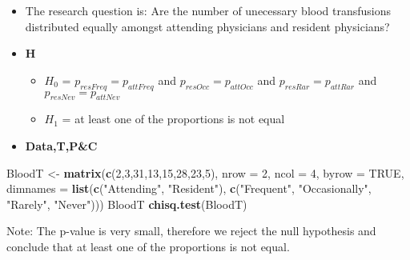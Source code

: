\documentclass[]{article}
\newenvironment{Shaded}{\begin{snugshade}}{\end{snugshade}}
\newcommand{\DataTypeTok}[1]{\textcolor[rgb]{0.13,0.29,0.53}{#1}}
\newcommand{\DecValTok}[1]{\textcolor[rgb]{0.00,0.00,0.81}{#1}}
\newcommand{\KeywordTok}[1]{\textcolor[rgb]{0.13,0.29,0.53}{\textbf{#1}}}
\newcommand{\NormalTok}[1]{#1}
\newcommand{\OtherTok}[1]{\textcolor[rgb]{0.56,0.35,0.01}{#1}}
\newcommand{\StringTok}[1]{\textcolor[rgb]{0.31,0.60,0.02}{#1}}
\begin{document}
\begin{itemize}
\item
  The research question is: Are the number of unecessary blood transfusions distributed equally amongst attending physicians and resident physicians?
\item
  \textbf{H}

  \begin{itemize}
  \item
    \(H_0\) = \(p_{resFreq}=p_{attFreq}\) and \(p_{resOcc}=p_{attOcc}\) and \(p_{resRar}=p_{attRar}\) and \(p_{resNev}=p_{attNev}\)
  \item
    \(H_1\) = at least one of the proportions is not equal
  \end{itemize}
\item
  \textbf{Data,T,P\&C}
\end{itemize}

\begin{Shaded}
\begin{Highlighting}[]
\NormalTok{BloodT <-}\StringTok{ }\KeywordTok{matrix}\NormalTok{(}\KeywordTok{c}\NormalTok{(}\DecValTok{2}\NormalTok{,}\DecValTok{3}\NormalTok{,}\DecValTok{31}\NormalTok{,}\DecValTok{13}\NormalTok{,}\DecValTok{15}\NormalTok{,}\DecValTok{28}\NormalTok{,}\DecValTok{23}\NormalTok{,}\DecValTok{5}\NormalTok{), }\DataTypeTok{nrow =} \DecValTok{2}\NormalTok{, }\DataTypeTok{ncol =} \DecValTok{4}\NormalTok{, }\DataTypeTok{byrow =} \OtherTok{TRUE}\NormalTok{, }\DataTypeTok{dimnames =} \KeywordTok{list}\NormalTok{(}\KeywordTok{c}\NormalTok{(}\StringTok{"Attending"}\NormalTok{, }\StringTok{"Resident"}\NormalTok{), }\KeywordTok{c}\NormalTok{(}\StringTok{"Frequent"}\NormalTok{, }\StringTok{"Occasionally"}\NormalTok{, }\StringTok{"Rarely"}\NormalTok{, }\StringTok{"Never"}\NormalTok{)))}
\NormalTok{BloodT}
\KeywordTok{chisq.test}\NormalTok{(BloodT)}
\end{Highlighting}
\end{Shaded}

Note: The p-value is very small, therefore we reject the null hypothesis and conclude that at least one of the proportions is not equal.
\end{document}
